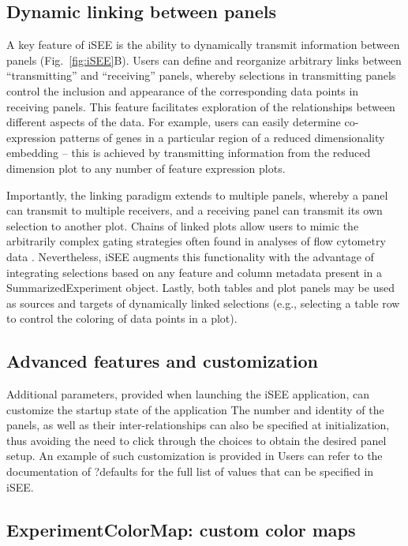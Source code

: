 \documentclass[10pt,a4paper,twocolumn]{article}
\begin{document}
\subsection*{Dynamic linking between panels}
A key feature of iSEE is the ability to dynamically transmit information between panels (Fig.~\ref{fig:iSEE}B).
Users can define and reorganize arbitrary links between ``transmitting'' and ``receiving'' panels, whereby selections in transmitting panels control the inclusion and appearance of the corresponding data points in receiving panels.
This feature facilitates exploration of the relationships between different aspects of the data.
For example, users can easily determine co-expression patterns of genes in a particular region of a reduced dimensionality embedding -- this is achieved by transmitting information from the reduced dimension plot to any number of feature expression plots.

Importantly, the linking paradigm extends to multiple panels, whereby a panel can transmit to multiple receivers, and a receiving panel can transmit its own selection to another plot.
Chains of linked plots allow users to mimic the arbitrarily complex gating strategies often found in analyses of flow cytometry data \citep{finak2014opencyto}.
Nevertheless, iSEE augments this functionality with the advantage of integrating selections based on any feature and column metadata present in a SummarizedExperiment object.
Lastly, both tables and plot panels may be used as sources and targets of dynamically linked selections (e.g., selecting a table row to control the coloring of data points in a plot).

\subsection*{Advanced features and customization}

Additional parameters, provided when launching the iSEE application, can customize the startup state of the application
The number and identity of the panels, as well as their inter-relationships can also be specified at initialization, thus avoiding the need to click through the choices to obtain the desired panel setup.
An example of such customization is provided in %
Users can refer to the documentation of ?defaults for the full list of values that can be specified in iSEE.


\subsection*{ExperimentColorMap: custom color maps}
\end{document}
